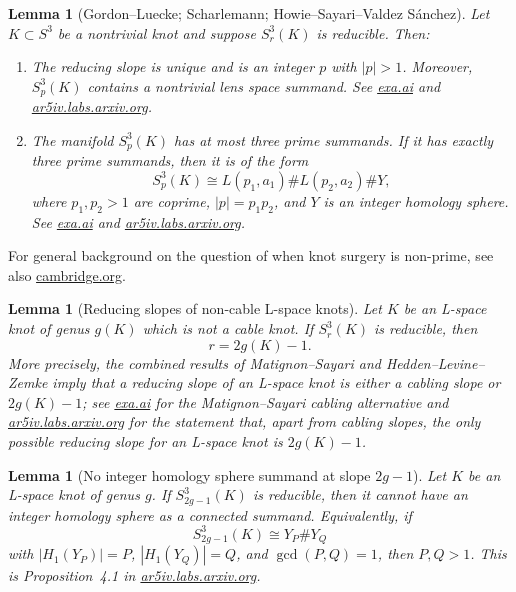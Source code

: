 \documentclass{article}
\newtheorem{lemma}[theorem]{Lemma}
\theoremstyle{definition}
\begin{document}
\begin{lemma}[Gordon--Luecke; Scharlemann; Howie--Sayari--Valdez S\'anchez]
\label{lem:general-reducible}
Let \(K\subset S^{3}\) be a nontrivial knot and suppose
\(S^{3}_{r}(K)\) is reducible.  Then:
\begin{enumerate}
  \item The reducing slope is unique and is an integer \(p\) with
  \(|p|>1\).  Moreover, \(S^{3}_{p}(K)\) contains a nontrivial lens space
  summand.  See
  \href{https://exa.ai/library/publication/zl1m8jt741b}{exa.ai}
  and
  \href{https://ar5iv.labs.arxiv.org/html/0908.2697}{ar5iv.labs.arxiv.org}.
  \item The manifold \(S^{3}_{p}(K)\) has at most three prime summands.
  If it has exactly three prime summands, then it is of the form
  \[
    S^{3}_{p}(K)\cong L(p_{1},a_{1})\# L(p_{2},a_{2})\# Y,
  \]
  where \(p_{1},p_{2}>1\) are coprime, \(|p|=p_{1}p_{2}\), and \(Y\) is an
  integer homology sphere.  See
  \href{https://exa.ai/library/publication/zl1m8jt741b}{exa.ai}
  and
  \href{https://ar5iv.labs.arxiv.org/html/0908.2697}{ar5iv.labs.arxiv.org}.
\end{enumerate}
\end{lemma}

For general background on the question of when knot surgery is non-prime,
see also
\href{https://www.cambridge.org/core/journals/mathematical-proceedings-of-the-cambridge-philosophical-society/article/abs/knot-surgery-and-primeness/29D04C8E36EF794942FA2F0925BE1775}{cambridge.org}.

\begin{lemma}[Reducing slopes of non-cable L-space knots]
\label{lem:HLZ}
Let \(K\) be an L-space knot of genus \(g(K)\) which is not a cable knot.
If \(S^{3}_{r}(K)\) is reducible, then
\[
  r=2g(K)-1.
\]
More precisely, the combined results of Matignon--Sayari and
Hedden--Levine--Zemke imply that a reducing slope of an L-space knot is
either a cabling slope or \(2g(K)-1\); see
\href{https://exa.ai/library/publication/zl1m8jt741b}{exa.ai}
for the Matignon--Sayari cabling alternative and
\href{https://ar5iv.labs.arxiv.org/html/2209.01672}{ar5iv.labs.arxiv.org}
for the statement that, apart from cabling slopes, the only possible reducing
slope for an L-space knot is \(2g(K)-1\).
\end{lemma}

\begin{lemma}[No integer homology sphere summand at slope \(2g-1\)]
\label{lem:no-HS}
Let \(K\) be an L-space knot of genus \(g\).  If
\(S^{3}_{2g-1}(K)\) is reducible, then it cannot have an integer homology
sphere as a connected summand.  Equivalently, if
\[
  S^{3}_{2g-1}(K)\cong Y_{P}\# Y_{Q}
\]
with \(|H_{1}(Y_{P})|=P\), \(|H_{1}(Y_{Q})|=Q\), and \(\gcd(P,Q)=1\), then
\(P,Q>1\).  This is Proposition~4.1 in
\href{https://ar5iv.labs.arxiv.org/html/2209.01672}{ar5iv.labs.arxiv.org}.
\end{lemma}
\end{document}
